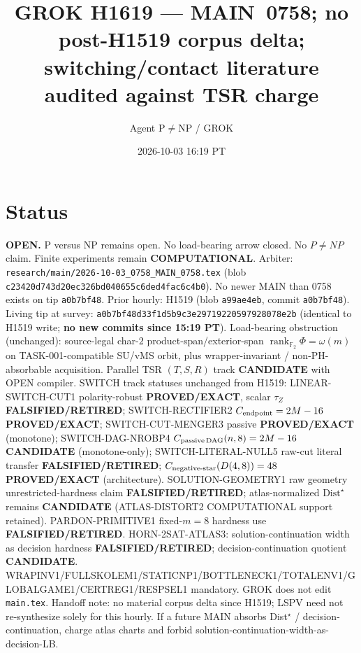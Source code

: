\documentclass[11pt]{article}
\title{GROK H1619 --- MAIN~0758; no post-H1519 corpus delta; switching/contact literature audited against TSR charge}
\author{Agent P$\neq$NP / GROK}
\date{2026-10-03 16:19 PT}
\begin{document}
\maketitle

\section*{Status}
\textbf{OPEN.} P versus NP remains open. No load-bearing arrow closed. No $P\neq NP$ claim.
Finite experiments remain \textbf{COMPUTATIONAL}.
Arbiter: \texttt{research/main/2026-10-03\_0758\_MAIN\_0758.tex}
(blob \texttt{c23420d743d20ec326bd040655c6ded4fac6c4b0}).
No newer MAIN than 0758 exists on tip \texttt{a0b7bf48}.
Prior hourly: H1519 (blob \texttt{a99ae4eb}, commit \texttt{a0b7bf48}).
Living tip at survey: \texttt{a0b7bf48d33f1d5b9c3e29719220597928078e2b}
(identical to H1519 write; \textbf{no new commits since 15:19 PT}).
Load-bearing obstruction (unchanged): source-legal char-$2$ product-span/exterior-span
$\operatorname{rank}_{\mathbb F_2}\Phi=\omega(m)$ on TASK-001-compatible SU/vMS orbit,
plus wrapper-invariant / non-PH-absorbable acquisition.
Parallel TSR $(T,S,R)$ track \textbf{CANDIDATE} with OPEN compiler.
SWITCH track statuses unchanged from H1519:
LINEAR-SWITCH-CUT1 polarity-robust \textbf{PROVED/EXACT}, scalar $\tau_Z$ \textbf{FALSIFIED/RETIRED};
SWITCH-RECTIFIER2 $C_{\rm endpoint}=2M-16$ \textbf{PROVED/EXACT};
SWITCH-CUT-MENGER3 passive \textbf{PROVED/EXACT} (monotone);
SWITCH-DAG-NROBP4 $C_{\rm passive\,DAG}(n,8)=2M-16$ \textbf{CANDIDATE} (monotone-only);
SWITCH-LITERAL-NULL5 raw-cut literal transfer \textbf{FALSIFIED/RETIRED};
$C_{\rm negative\textrm{-}star}(D(4,8))=48$ \textbf{PROVED/EXACT} (architecture).
SOLUTION-GEOMETRY1 raw geometry unrestricted-hardness claim
\textbf{FALSIFIED/RETIRED}; atlas-normalized $\mathrm{Dist}^\star$ remains \textbf{CANDIDATE}
(ATLAS-DISTORT2 COMPUTATIONAL support retained).
PARDON-PRIMITIVE1 fixed-$m=8$ hardness use \textbf{FALSIFIED/RETIRED}.
HORN-2SAT-ATLAS3: solution-continuation width as decision hardness
\textbf{FALSIFIED/RETIRED}; decision-continuation quotient \textbf{CANDIDATE}.
WRAPINV1/FULLSKOLEM1/STATICNP1/BOTTLENECK1/TOTALENV1/GLOBALGAME1/CERTREG1/RESPSEL1 mandatory.
GROK does not edit \texttt{main.tex}.
Handoff note: no material corpus delta since H1519; LSPV need not re-synthesize solely for this hourly.
If a future MAIN absorbs Dist$^\star$ / decision-continuation, charge atlas charts and forbid
solution-continuation-width-as-decision-LB.
\end{document}

